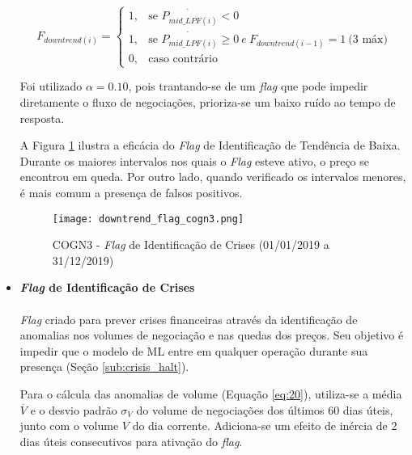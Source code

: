 \begin{itemize}
    \begin{equation} \label{eq:25}
        F_{downtrend(i)} = \begin{cases} 1, & \mbox{se } \dot{P_{mid\_LPF(i)}} < 0 \\
            1, & \mbox{se } \dot{P_{mid\_LPF(i)}} \ge 0 \  e \  F_{downtrend(i-1)} = 1 \  \textrm{(3 m\'ax)} \\
            0, & \mbox{caso contr\'ario} \end{cases}
    \end{equation}

    Foi utilizado \begin{math} \alpha = 0.10 \end{math}, pois trantando-se de um \textit{flag} que pode impedir diretamente o fluxo de negociações, prioriza-se um baixo ruído ao tempo de resposta.

    A Figura \ref{fig:109} ilustra a eficácia do \textit{Flag} de Identificação de Tendência de Baixa. Durante os maiores intervalos nos quais o \textit{Flag} esteve ativo, o preço se encontrou em queda. Por outro lado, quando verificado os intervalos menores, é mais comum a presença de falsos positivos.

    \begin{figure}[!htb]
        \texttt{[image: downtrend\_flag\_cogn3.png]}
        \centering
        \caption{COGN3 - \textit{Flag} de Identificação de Crises (01/01/2019 a 31/12/2019)}
        \label{fig:109}
    \end{figure}


    \item \textbf{\textit{Flag} de Identificação de Crises} \\ \\
        \textit{Flag} criado para prever crises financeiras através da identificação de anomalias nos volumes de negociação e nas quedas dos preços. Seu objetivo é impedir que o modelo de ML entre em qualquer operação durante sua presença (Seção \ref{sub:crisis_halt}).

        Para o cálcula das anomalias de volume (Equação \ref{eq:20}), utiliza-se a média \begin{math} \overline{V} \end{math} e o desvio padrão \begin{math} \sigma_V \end{math} do volume de negociações dos últimos 60 dias úteis, junto com o volume \begin{math} V \end{math} do dia corrente. Adiciona-se um efeito de inércia de 2 dias úteis consecutivos para ativação do \textit{flag}.


\end{itemize}
